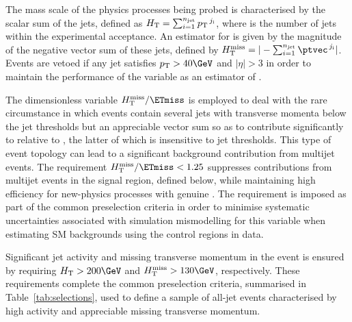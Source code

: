 The mass scale of the physics processes being probed is characterised
by the scalar \Pt sum of the jets, defined as $H_{\mathrm{T}} =
\sum_{i=1}^{n_{\text{jet}}} {p_{\text T}}^{\,j_\text{i}}$, where \njet is the number of
jets within the experimental acceptance. An estimator for \ETmiss is
given by the magnitude of the negative vector \ptvec sum of these
jets, defined by $\HTmiss = |-\sum_{i=1}^{\njet}
\ptvec^{\,j_\text{i}}|$. Events are vetoed if any jet satisfies $\Pt >
40\GeV$ and $|\eta| > 3$ in order to maintain the performance of the
variable \HTmiss as an estimator of \ETmiss.

The dimensionless variable $\HTmiss / \ETmiss$ is employed to deal
with the rare circumstance in which events contain several jets with
transverse momenta below the jet \Pt thresholds but an appreciable \Pt
vector sum so as to contribute significantly to \HTmiss relative to
\ETmiss, the latter of which is insensitive to jet \Pt
thresholds. This type of event topology can lead to a significant
background contribution from multijet events. The requirement $\HTmiss
/ \ETmiss < 1.25$ suppresses contributions from multijet events in the
signal region, defined below, while maintaining high efficiency for
new-physics processes with genuine \ptvecmiss. The requirement is
imposed as part of the common preselection criteria in order to
minimise systematic uncertainties associated with simulation
mismodelling for this variable when estimating SM backgrounds using
the control regions in data.

Significant jet activity and missing transverse momentum in the event
is ensured by requiring $\scalht > 200\GeV$ and $\HTmiss > 130\GeV$,
respectively. These requirements complete the common preselection
criteria, summarised in Table~\ref{tab:selections}, used to define a
sample of all-jet events characterised by high activity and
appreciable missing transverse momentum.

